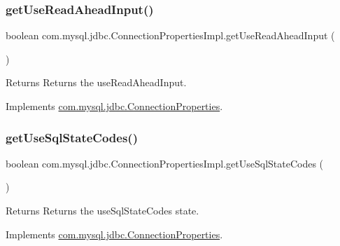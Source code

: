 \subsubsection{\texorpdfstring{get\+Use\+Read\+Ahead\+Input()}{getUseReadAheadInput()}}
{\footnotesize\ttfamily boolean com.\+mysql.\+jdbc.\+Connection\+Properties\+Impl.\+get\+Use\+Read\+Ahead\+Input (\begin{DoxyParamCaption}{ }\end{DoxyParamCaption})}

\begin{DoxyReturn}{Returns}
Returns the use\+Read\+Ahead\+Input. 
\end{DoxyReturn}


Implements \mbox{\hyperlink{interfacecom_1_1mysql_1_1jdbc_1_1_connection_properties_abad9605452003baa9e6841a990334c92}{com.\+mysql.\+jdbc.\+Connection\+Properties}}.

\mbox{\label{classcom_1_1mysql_1_1jdbc_1_1_connection_properties_impl_a3e42bff7235239786fc02a0fba94564d}} 
\subsubsection{\texorpdfstring{get\+Use\+Sql\+State\+Codes()}{getUseSqlStateCodes()}}
{\footnotesize\ttfamily boolean com.\+mysql.\+jdbc.\+Connection\+Properties\+Impl.\+get\+Use\+Sql\+State\+Codes (\begin{DoxyParamCaption}{ }\end{DoxyParamCaption})}

\begin{DoxyReturn}{Returns}
Returns the use\+Sql\+State\+Codes state. 
\end{DoxyReturn}


Implements \mbox{\hyperlink{interfacecom_1_1mysql_1_1jdbc_1_1_connection_properties_a399c463bcd4def7a8476647b2e09fd72}{com.\+mysql.\+jdbc.\+Connection\+Properties}}.

\mbox{\label{classcom_1_1mysql_1_1jdbc_1_1_connection_properties_impl_adf1142d7968af82cc92cee38ac0b3c5a}} 
